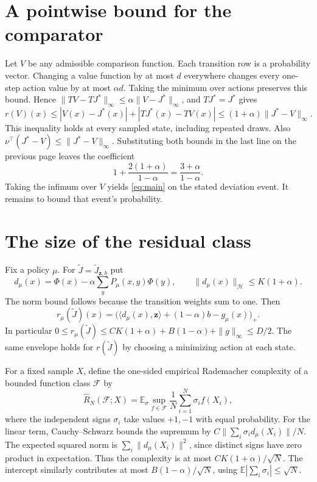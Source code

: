 \documentclass[12pt,a4paper]{article}
\newcommand{\pos}[1]{\bigl(#1\bigr)_+}
\newcommand{\E}{\mathbb E}
\begin{document}
\section*{A pointwise bound for the comparator}
Let \(V\) be any admissible comparison function. Each transition row is a
probability vector. Changing a value function by at most \(d\) everywhere
changes every one-step action value by at most \(\alpha d\). Taking the
minimum over actions preserves this bound. Hence
\(\|TV-TJ^*\|_\infty\le\alpha\|V-J^*\|_\infty\), and \(TJ^*=J^*\) gives
\[
 r(V)(x)\le |V(x)-J^*(x)|+|TJ^*(x)-TV(x)|
           \le (1+\alpha)\|J^*-V\|_\infty .
\]
This inequality holds at every sampled state, including repeated draws.
Also \(\nu^\top(J^*-V)\le\|J^*-V\|_\infty\). Substituting both bounds
in the last line on the previous page leaves the coefficient
\[
 1+\frac{2(1+\alpha)}{1-\alpha}=\frac{3+\alpha}{1-\alpha}.
\]
Taking the infimum over \(V\) yields \eqref{eq:main} on the stated
deviation event. It remains to bound that event's probability.

\section*{The size of the residual class}
Fix a policy \(\mu\). For \(\widetilde J=\widetilde J_{\mathbf z,b}\) put
\[
 d_\mu(x)=\Phi(x)-\alpha\sum_y P_\mu(x,y)\Phi(y),\qquad
 \|d_\mu(x)\|_{\mathcal H}\le K(1+\alpha).
\]
The norm bound follows because the transition weights sum to one. Then
\[
 r_\mu(\widetilde J)(x)=
 \pos{\langle d_\mu(x),\mathbf z\rangle+(1-\alpha)b-g_\mu(x)} .
\]
In particular \(0\le r_\mu(\widetilde J)\le CK(1+\alpha)+B(1-\alpha)
+\|g\|_\infty\le D/2\). The same envelope holds for \(r(\widetilde J)\)
by choosing a minimizing action at each state.

For a fixed sample \(X\), define the one-sided empirical Rademacher complexity
of a bounded function class \(\mathcal F\) by
\[
 \widehat R_N(\mathcal F;X)
 =\E_\sigma\sup_{f\in\mathcal F}\frac1N\sum_{i=1}^N\sigma_i f(X_i),
\]
where the independent signs \(\sigma_i\) take values \(+1,-1\) with equal
probability. For the linear term, Cauchy--Schwarz bounds the supremum by
\(C\|\sum_i\sigma_i d_\mu(X_i)\|/N\). The expected squared norm is
\(\sum_i\|d_\mu(X_i)\|^2\), since distinct signs have zero product in
expectation. Thus the complexity is at most \(CK(1+\alpha)/\sqrt N\).
The intercept similarly contributes at most \(B(1-\alpha)/\sqrt N\),
using \(\E|\sum_i\sigma_i|\le\sqrt N\).

\newpage
\end{document}

